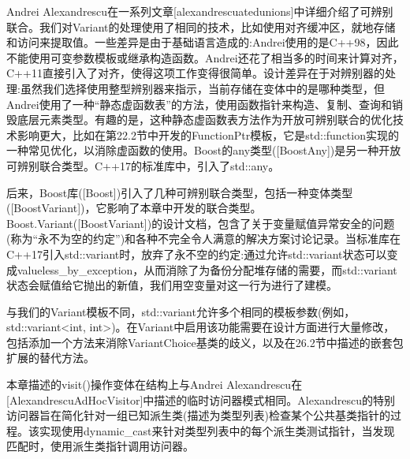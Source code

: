 Andrei Alexandrescu在一系列文章[alexandrescuatedunions]中详细介绍了可辨别联合。我们对Variant的处理使用了相同的技术，比如使用对齐缓冲区，就地存储和访问来提取值。一些差异是由于基础语言造成的:Andrei使用的是C++98，因此不能使用可变参数模板或继承构造函数。Andrei还花了相当多的时间来计算对齐，C++11直接引入了对齐，使得这项工作变得很简单。设计差异在于对辨别器的处理:虽然我们选择使用整型辨别器来指示，当前存储在变体中的是哪种类型，但Andrei使用了一种“静态虚函数表”的方法，使用函数指针来构造、复制、查询和销毁底层元素类型。有趣的是，这种静态虚函数表方法作为开放可辨别联合的优化技术影响更大，比如在第22.2节中开发的FunctionPtr模板，它是std::function实现的一种常见优化，以消除虚函数的使用。Boost的any类型([BoostAny])是另一种开放可辨别联合类型。C++17的标准库中，引入了std::any。

后来，Boost库([Boost])引入了几种可辨别联合类型，包括一种变体类型([BoostVariant])，它影响了本章中开发的联合类型。 Boost.Variant([BoostVariant])的设计文档，包含了关于变量赋值异常安全的问题(称为“永不为空的约定”)和各种不完全令人满意的解决方案讨论记录。当标准库在C++17引入std::variant时，放弃了永不空的约定:通过允许std::variant状态可以变成valueless\_by\_exception，从而消除了为备份分配堆存储的需要，而std::variant状态会赋值给它抛出的新值，我们用空变量对这一行为进行了建模。

与我们的Variant模板不同，std::variant允许多个相同的模板参数(例如，std::variant<int, int>)。在Variant中启用该功能需要在设计方面进行大量修改，包括添加一个方法来消除VariantChoice基类的歧义，以及在26.2节中描述的嵌套包扩展的替代方法。

本章描述的visit()操作变体在结构上与Andrei Alexandrescu在[AlexandrescuAdHocVisitor]中描述的临时访问器模式相同。Alexandrescu的特别访问器旨在简化针对一组已知派生类(描述为类型列表)检查某个公共基类指针的过程。该实现使用dynamic\_cast来针对类型列表中的每个派生类测试指针，当发现匹配时，使用派生类指针调用访问器。



